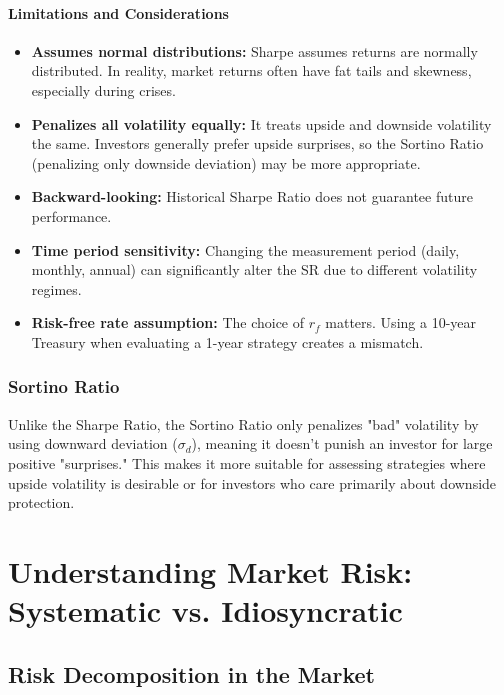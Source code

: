 \paragraph{Limitations and Considerations}
\begin{itemize}
    \item \textbf{Assumes normal distributions:} Sharpe assumes returns are normally distributed. In reality, market returns often have fat tails and skewness, especially during crises.
    
    \item \textbf{Penalizes all volatility equally:} It treats upside and downside volatility the same. Investors generally prefer upside surprises, so the Sortino Ratio (penalizing only downside deviation) may be more appropriate.
    
    \item \textbf{Backward-looking:} Historical Sharpe Ratio does not guarantee future performance.
    
    \item \textbf{Time period sensitivity:} Changing the measurement period (daily, monthly, annual) can significantly alter the SR due to different volatility regimes.
    
    \item \textbf{Risk-free rate assumption:} The choice of $r_f$ matters. Using a 10-year Treasury when evaluating a 1-year strategy creates a mismatch.
\end{itemize}

\subsubsection{Sortino Ratio}

Unlike the Sharpe Ratio, the Sortino Ratio only penalizes "bad" volatility by using downward deviation ($\sigma_d$), meaning it doesn't punish an investor for large positive "surprises." This makes it more suitable for assessing strategies where upside volatility is desirable or for investors who care primarily about downside protection.

\section{Understanding Market Risk: Systematic vs. Idiosyncratic}

\subsection{Risk Decomposition in the Market}

